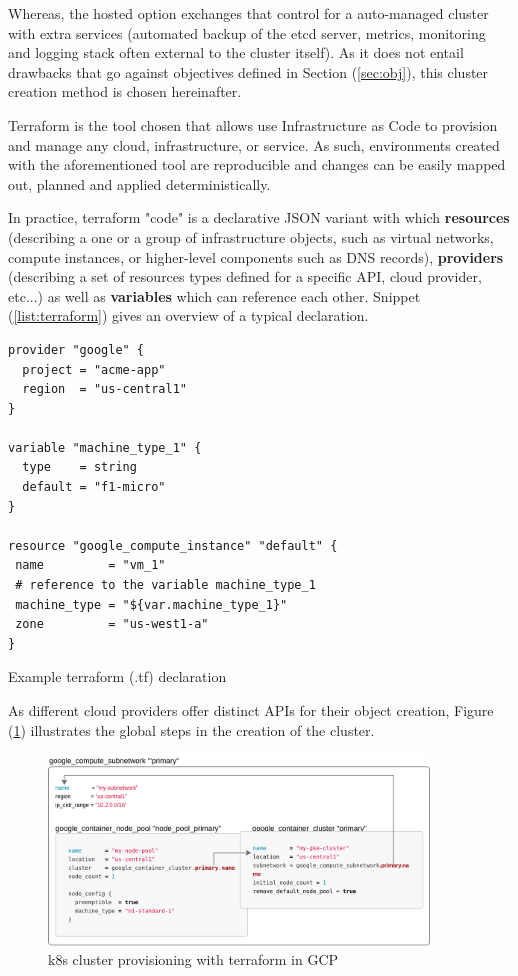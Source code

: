 \documentclass[11pt]{article}
\begin{document}
Whereas, the hosted option exchanges that control for a auto-managed cluster with extra services (automated backup of the etcd server, metrics, monitoring and logging stack often external to the cluster itself). As it does not entail drawbacks that go against objectives defined in Section (\ref{sec:obj}), this cluster creation method is chosen hereinafter.

 \label{sec:terraform}

\vspace{-5mm}\hspace{5mm} Terraform is the tool chosen that allows use Infrastructure as Code to provision and manage any cloud, infrastructure, or service. As such, environments created with the aforementioned tool are reproducible and changes can be easily mapped out, planned and applied deterministically. 

In practice, terraform "code" is a declarative JSON variant with which \textbf{resources} (describing a one or a group of infrastructure objects, such as virtual networks, compute instances, or higher-level components such as DNS records), \textbf{providers} (describing a set of resources types defined for a specific API, cloud provider, etc...) as well as \textbf{variables} which can reference each other. Snippet (\ref{list:terraform}) gives an overview of a typical declaration.

\begin{listing}[ht]
\begin{verbatim}
provider "google" {
  project = "acme-app"
  region  = "us-central1"
}

variable "machine_type_1" {
  type    = string
  default = "f1-micro"
}

resource "google_compute_instance" "default" {
 name         = "vm_1"
 # reference to the variable machine_type_1
 machine_type = "${var.machine_type_1}"
 zone         = "us-west1-a"
}
\end{verbatim}
\caption{Example terraform (.tf) declaration}
\label{list:terraform}
\end{listing}

As different cloud providers offer distinct APIs for their object creation, Figure (\ref{fig:terraform_gcp}) illustrates the global steps in the creation of the cluster.

\begin{figure}[!h]
    \centering
    \includegraphics[width=0.9\textwidth]{terraform_gcp.png}
    \caption{k8s cluster provisioning with terraform in GCP}
    \label{fig:terraform_gcp}
\end{figure}
\end{document}
